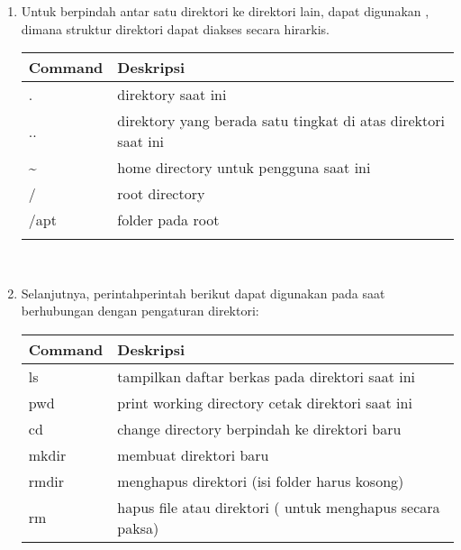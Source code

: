 \documentclass[letterpaper,10pt,english]{sphinxmanual}
\begin{document}
\begin{enumerate}
%
\item {} 
Untuk berpindah antar satu direktori ke direktori lain, dapat digunakan , dimana struktur direktori dapat diakses secara hirarkis.


\begin{savenotes}\sphinxattablestart
\centering
\begin{tabulary}{\linewidth}[t]{|T|T|}
\hline
\sphinxstyletheadfamily 
Command
&\sphinxstyletheadfamily 
Deskripsi
\\
\hline
.
&
direktory saat ini
\\
\hline
..
&
direktory yang berada satu tingkat di atas direktori saat ini
\\
\hline
\textasciitilde{}
&
home directory untuk pengguna saat ini
\\
\hline
/
&
root directory
\\
\hline
/apt
&
folder  pada root
\\
\hline

&

\\
\hline
\end{tabulary}
\par
\sphinxattableend\end{savenotes}

 

\item {} 
Selanjutnya, perintah\sphinxhyphen{}perintah berikut dapat digunakan pada saat berhubungan dengan pengaturan direktori:


\begin{savenotes}\sphinxattablestart
\centering
\begin{tabulary}{\linewidth}[t]{|T|T|}
\hline
\sphinxstyletheadfamily 
Command
&\sphinxstyletheadfamily 
Deskripsi
\\
\hline
ls
&
tampilkan daftar berkas pada direktori saat ini
\\
\hline
pwd
&
print working directory \sphinxhyphen{} cetak direktori saat ini
\\
\hline
cd
&
change directory \sphinxhyphen{} berpindah ke direktori baru
\\
\hline
mkdir
&
membuat direktori baru
\\
\hline
rmdir
&
menghapus direktori (isi folder harus kosong)
\\
\hline
rm
&
hapus file atau direktori ( untuk menghapus secara paksa)
\\
\hline


\end{tabulary}
\end{savenotes}
\end{enumerate}
\end{document}
